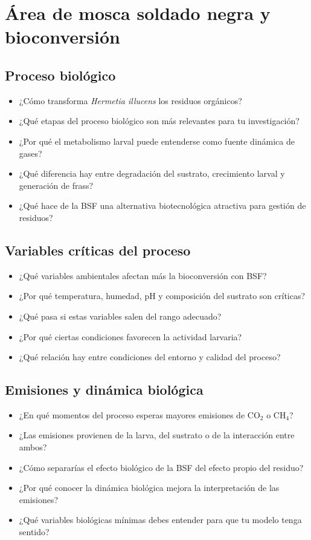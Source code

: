 \documentclass[11pt]{article}
\begin{document}
\section{Área de mosca soldado negra y bioconversión}

\subsection*{Proceso biológico}
\begin{itemize}[leftmargin=*]
    \item ¿Cómo transforma \textit{Hermetia illucens} los residuos orgánicos?
    \item ¿Qué etapas del proceso biológico son más relevantes para tu investigación?
    \item ¿Por qué el metabolismo larval puede entenderse como fuente dinámica de gases?
    \item ¿Qué diferencia hay entre degradación del sustrato, crecimiento larval y generación de frass?
    \item ¿Qué hace de la BSF una alternativa biotecnológica atractiva para gestión de residuos?
\end{itemize}

\subsection*{Variables críticas del proceso}
\begin{itemize}[leftmargin=*]
    \item ¿Qué variables ambientales afectan más la bioconversión con BSF?
    \item ¿Por qué temperatura, humedad, pH y composición del sustrato son críticas?
    \item ¿Qué pasa si estas variables salen del rango adecuado?
    \item ¿Por qué ciertas condiciones favorecen la actividad larvaria?
    \item ¿Qué relación hay entre condiciones del entorno y calidad del proceso?
\end{itemize}

\subsection*{Emisiones y dinámica biológica}
\begin{itemize}[leftmargin=*]
    \item ¿En qué momentos del proceso esperas mayores emisiones de CO$_2$ o CH$_4$?
    \item ¿Las emisiones provienen de la larva, del sustrato o de la interacción entre ambos?
    \item ¿Cómo separarías el efecto biológico de la BSF del efecto propio del residuo?
    \item ¿Por qué conocer la dinámica biológica mejora la interpretación de las emisiones?
    \item ¿Qué variables biológicas mínimas debes entender para que tu modelo tenga sentido?
\end{itemize}
\end{document}

